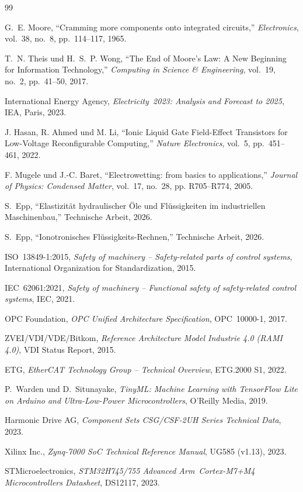 ﻿\documentclass[a4paper,12pt]{scrreprt}
\theoremstyle{definition}
\begin{document}
\begin{thebibliography}{99}

G.~E. Moore, ``Cramming more components onto integrated circuits,''
\textit{Electronics}, vol.~38, no.~8, pp.~114--117, 1965.

T.~N. Theis und H.~S.~P. Wong, ``The End of Moore's Law: A New
Beginning for Information Technology,''
\textit{Computing in Science \& Engineering}, vol.~19, no.~2,
pp.~41--50, 2017.

International Energy Agency, \textit{Electricity~2023: Analysis and
Forecast to 2025}, IEA, Paris, 2023.

J. Hasan, R. Ahmed und M. Li, ``Ionic Liquid Gate Field-Effect
Transistors for Low-Voltage Reconfigurable Computing,''
\textit{Nature Electronics}, vol.~5, pp.~451--461, 2022.

F. Mugele und J.-C. Baret, ``Electrowetting: from basics to applications,''
\textit{Journal of Physics: Condensed Matter}, vol.~17, no.~28,
pp. R705--R774, 2005.

S.~Epp, ``Elastizität hydraulischer Öle und Flüssigkeiten im
industriellen Maschinenbau,'' Technische Arbeit, 2026.

S.~Epp, ``Ionotronisches Flüssigkeits-Rechnen,'' Technische Arbeit, 2026.

ISO~13849-1:2015, \textit{Safety of machinery -- Safety-related parts
of control systems}, International Organization for Standardization, 2015.

IEC~62061:2021, \textit{Safety of machinery -- Functional safety of
safety-related control systems}, IEC, 2021.

OPC Foundation, \textit{OPC Unified Architecture Specification},
OPC~10000-1, 2017.

ZVEI/VDI/VDE/Bitkom, \textit{Reference Architecture Model Industrie
4.0 (RAMI 4.0)}, VDI Status Report, 2015.

ETG, \textit{EtherCAT Technology Group -- Technical Overview},
ETG.2000 S1, 2022.

P.~Warden und D.~Situnayake, \textit{TinyML: Machine Learning with
TensorFlow Lite on Arduino and Ultra-Low-Power Microcontrollers},
O'Reilly Media, 2019.

Harmonic Drive AG, \textit{Component Sets CSG/CSF-2UH Series
Technical Data}, 2023.

Xilinx Inc., \textit{Zynq-7000 SoC Technical Reference Manual},
UG585 (v1.13), 2023.

STMicroelectronics, \textit{STM32H745/755 Advanced Arm\textregistered\
Cortex\textregistered-M7+M4 Microcontrollers Datasheet}, DS12117, 2023.

\end{thebibliography}
\end{document}

